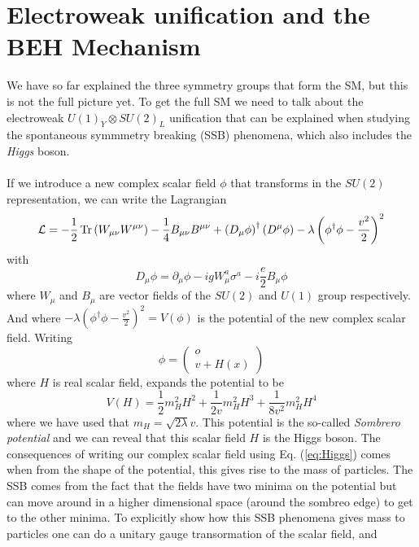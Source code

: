 \documentclass[12pt, a4paper]{book}
\begin{document}
\section{Electroweak unification and the BEH Mechanism}
We have so far explained the three symmetry groups that form the SM, but this is not the full picture yet. To get the full SM we need to talk about the electroweak $U(1)_Y\otimes SU(2)_L$ unification that can be explained when studying the spontaneous symmmetry breaking (SSB) phenomena, 
which also includes the \textit{Higgs} boson. \\
\\If we introduce a new complex scalar field $\phi$ that transforms in the $SU(2)$ representation, we can write the Lagrangian
\begin{equation}\label{eq:electroweak}
    \mathcal{L}=-\frac{1}{2}\Tr\left(W_{\mu\nu}W^{\mu\nu}\right)-\frac{1}{4}B_{\mu\nu}B^{\mu\nu}+\left(D_\mu \phi\right)^\dagger\left(D^\mu \phi\right) -\lambda\left(\phi^\dagger \phi -\frac{v^2}{2}\right)^2
\end{equation}
with 
\begin{equation}\label{eq:covar_higgs}
    D_\mu \phi =\partial_\mu \phi -igW_\mu^a\sigma^a-i\frac{e}{2}B_\mu \phi
\end{equation}
where $W_\mu$ and $B_\mu$ are vector fields of the $SU(2)$ and $U(1)$ group respectively. And where $ -\lambda\left(\phi^\dagger \phi -\frac{v^2}{2}\right)^2 = V(\phi)$ is the potential of the new complex scalar field. 
Writing 
\begin{equation}\label{eq:Higgs}
    \phi = \begin{pmatrix}
        o\\v+H(x)
    \end{pmatrix}
\end{equation}
where $H$ is real scalar field, expands the potential to be
\begin{equation}\label{eq:sombrero}
    V(H) =\frac{1}{2}m_H^2H^2 + \frac{1}{2v}m_H^2H^3 +\frac{1}{8v^2}m_H^2H^4
\end{equation}
where we have used that $m_H = \sqrt{2\lambda}v$. This potential is the so-called \textit{Sombrero potential} and we can reveal that this scalar field $H$ is the Higgs boson. 
The consequences of writing our complex scalar field using Eq. (\ref{eq:Higgs}) comes when from the shape of the potential, this gives rise to the mass of particles. The SSB comes from the fact that the fields have two minima 
on the potential but can move around in a higher dimensional space (around the sombreo edge) to get to the other minima. To explicitly show how this SSB phenomena gives mass to particles one can do a unitary gauge transormation of the scalar field, and 
\end{document}
